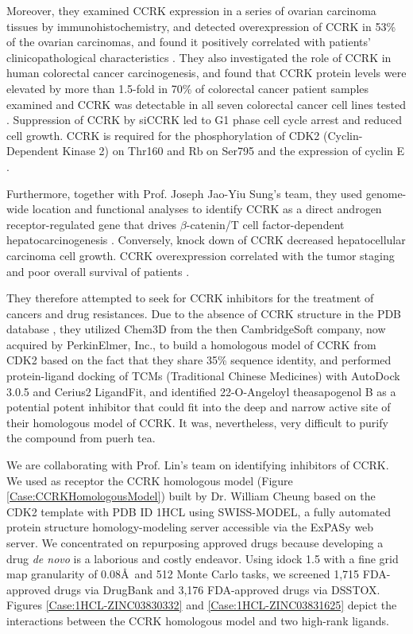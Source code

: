 Moreover, they examined CCRK expression in a series of ovarian carcinoma tissues by immunohistochemistry, and detected overexpression of CCRK in 53\% of the ovarian carcinomas, and found it positively correlated with patients' clinicopathological characteristics \citep{1145}. They also investigated the role of CCRK in human colorectal cancer carcinogenesis, and found that CCRK protein levels were elevated by more than 1.5-fold in 70\% of colorectal cancer patient samples examined and CCRK was detectable in all seven colorectal cancer cell lines tested \citep{1143}. Suppression of CCRK by siCCRK led to G1 phase cell cycle arrest and reduced cell growth. CCRK is required for the phosphorylation of CDK2 (Cyclin-Dependent Kinase 2) on Thr160 and Rb on Ser795 and the expression of cyclin E \citep{1143}. 

Furthermore, together with Prof. Joseph Jao-Yiu Sung's team, they used genome-wide location and functional analyses to identify CCRK as a direct androgen receptor-regulated gene that drives $\beta$-catenin/T cell factor-dependent hepatocarcinogenesis \citep{1146}. Conversely, knock down of CCRK decreased hepatocellular carcinoma cell growth. CCRK overexpression correlated with the tumor staging and poor overall survival of patients \citep{1146}.

They therefore attempted to seek for CCRK inhibitors for the treatment of cancers and drug resistances. Due to the absence of CCRK structure in the PDB database \citep{540,537}, they utilized Chem3D from the then CambridgeSoft company, now acquired by PerkinElmer, Inc., to build a homologous model of CCRK from CDK2 based on the fact that they share 35\% sequence identity, and performed protein-ligand docking of TCMs (Traditional Chinese Medicines) with AutoDock 3.0.5 and Cerius2 LigandFit, and identified 22-O-Angeloyl theasapogenol B as a potential potent inhibitor that could fit into the deep and narrow active site of their homologous model of CCRK. It was, nevertheless, very difficult to purify the compound from puerh tea.

We are collaborating with Prof. Lin's team on identifying inhibitors of CCRK. We used as receptor the CCRK homologous model (Figure \ref{Case:CCRKHomologousModel}) built by Dr. William Cheung based on the CDK2 template with PDB ID 1HCL \citep{1142} using SWISS-MODEL, a fully automated protein structure homology-modeling server accessible via the ExPASy web server. We concentrated on repurposing approved drugs \citep{944,1023} because developing a drug \textit{de novo} is a laborious and costly endeavor. Using idock 1.5 with a fine grid map granularity of 0.08\AA\ and 512 Monte Carlo tasks, we screened 1,715 FDA-approved drugs via DrugBank and 3,176 FDA-approved drugs via DSSTOX. Figures \ref{Case:1HCL-ZINC03830332} and \ref{Case:1HCL-ZINC03831625} depict the interactions between the CCRK homologous model and two high-rank ligands.

